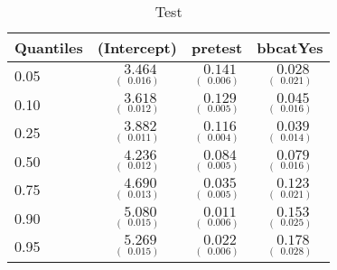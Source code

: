 %
\begin{table}[hptb]
\caption{Test\label{table}}
\begin{center}
\begin{tabular}{|l||c|c|c|} \hline
\multicolumn{1}{|l||}{Quantiles}&\multicolumn{1}{c|}{(Intercept)}&\multicolumn{1}{c|}{pretest}&\multicolumn{1}{c|}{bbcatYes}\\ \hline
0.05&$\underset{(~~0.016)}{~~3.464}$&$\underset{(~~0.006)}{~~0.141}$&$\underset{(~~0.021)}{~~0.028}$\\ 
0.10&$\underset{(~~0.012)}{~~3.618}$&$\underset{(~~0.005)}{~~0.129}$&$\underset{(~~0.016)}{~~0.045}$\\ 
0.25&$\underset{(~~0.011)}{~~3.882}$&$\underset{(~~0.004)}{~~0.116}$&$\underset{(~~0.014)}{~~0.039}$\\ 
0.50&$\underset{(~~0.012)}{~~4.236}$&$\underset{(~~0.005)}{~~0.084}$&$\underset{(~~0.016)}{~~0.079}$\\ 
0.75&$\underset{(~~0.013)}{~~4.690}$&$\underset{(~~0.005)}{~~0.035}$&$\underset{(~~0.021)}{~~0.123}$\\ 
0.90&$\underset{(~~0.015)}{~~5.080}$&$\underset{(~~0.006)}{~~0.011}$&$\underset{(~~0.025)}{~~0.153}$\\ 
0.95&$\underset{(~~0.015)}{~~5.269}$&$\underset{(~~0.006)}{~~0.022}$&$\underset{(~~0.028)}{~~0.178}$\\ 
\hline
\end{tabular}
\vspace{3mm}
\end{center}
\end{table}
